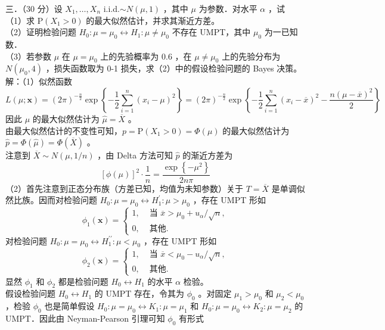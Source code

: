 \documentclass[UTF8]{ctexart}
\begin{document}
\noindent 三．（30 分）设 $X_1, \ldots, X_n$ i.i.d.$\sim N(\mu, 1)$ ，其中 $\mu$ 为参数．对水平 $\alpha$ ，试\\
（1）求 $\mathrm{P}\left(X_1>0\right)$ 的最大似然估计，并求其渐近方差。\\
（2）证明检验问题 $H_0: \mu=\mu_0 \leftrightarrow H_1: \mu \neq \mu_0$ 不存在 UMPT，其中 $\mu_0$ 为一已知数．\\
（3）若参数 $\mu$ 在 $\mu=\mu_0$ 上的先验概率为 0.6 ，在 $\mu \neq \mu_0$ 上的先验分布为 $N\left(\mu_0, 4\right)$ ，损失函数取为 0-1 损失，求（2）中的假设检验问题的 Bayes 决策。\\
解：（1）似然函数
$$
L(\mu ; \boldsymbol{x})=(2 \pi)^{-\frac{n}{2}} \exp \left\{-\frac{1}{2} \sum_{i=1}^n\left(x_i-\mu\right)^2\right\}=(2 \pi)^{-\frac{n}{2}} \exp \left\{-\frac{1}{2} \sum_{i=1}^n\left(x_i-\overline{x}\right)^2-\frac{n(\mu-\overline{x})^2}{2}\right\}
$$
因此 $\mu$ 的最大似然估计为 $\hat{\mu}=\overline{X}$ 。\\
由最大似然估计的不变性可知，$p=\mathrm{P}\left(X_1>0\right)=\Phi(\mu)$ 的最大似然估计为 $\hat{p}=\Phi(\hat{\mu})=\Phi(\overline{X})$ 。\\
注意到 $\overline{X} \sim N(\mu, 1 / n)$ ，由 Delta 方法可知 $\hat{p}$ 的渐近方差为
$$
[\phi(\mu)]^2 \cdot \frac{1}{n}=\frac{\exp \left\{-\mu^2\right\}}{2 n \pi}
$$
（2）首先注意到正态分布族（方差已知，均值为未知参数）关于 $T=\overline{X}$ 是单调似然比族。因而对检验问题 $H_0: \mu=\mu_0 \leftrightarrow H_1^{\prime}: \mu>\mu_0$ ，存在 UMPT 形如
$$
\phi_1(\boldsymbol{x})= \begin{cases}1, & \text { 当 } \overline{x}>\mu_0+u_\alpha / \sqrt{n}, \\ 0, & \text { 其他. }\end{cases}
$$
对检验问题 $H_0: \mu=\mu_0 \leftrightarrow H_1^{\prime \prime}: \mu<\mu_0$ ，存在 UMPT 形如
$$
\phi_2(\boldsymbol{x})= \begin{cases}1, & \text { 当 } \overline{x}<\mu_0-u_\alpha / \sqrt{n}, \\ 0, & \text { 其他. }\end{cases}
$$
显然 $\phi_1$ 和 $\phi_2$ 都是检验问题 $H_0 \leftrightarrow H_1$ 的水平 $\alpha$ 检验。\\
假设检验问题 $H_0 \leftrightarrow H_1$ 的 UMPT 存在，令其为 $\phi_0$ 。对固定 $\mu_1>\mu_0$ 和 $\mu_2<\mu_0$ ，检验 $\phi_0$ 也是简单假设 $H_0: \mu=\mu_0 \leftrightarrow K_1: \mu=\mu_1$ 和 $H_0: \mu=\mu_0 \leftrightarrow K_2: \mu=\mu_2$ 的UMPT．因此由 Neyman-Pearson 引理可知 $\phi_0$ 有形式
\end{document}
